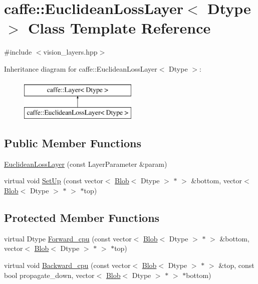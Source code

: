 \hypertarget{classcaffe_1_1_euclidean_loss_layer}{\section{caffe\+:\+:Euclidean\+Loss\+Layer$<$ Dtype $>$ Class Template Reference}
\label{classcaffe_1_1_euclidean_loss_layer}
}


{\ttfamily \#include $<$vision\+\_\+layers.\+hpp$>$}

Inheritance diagram for caffe\+:\+:Euclidean\+Loss\+Layer$<$ Dtype $>$\+:\begin{figure}[H]
\begin{center}
\leavevmode
\includegraphics[height=2.000000cm]{classcaffe_1_1_euclidean_loss_layer}
\end{center}
\end{figure}
\subsection*{Public Member Functions}
\begin{DoxyCompactItemize}
\item 
\hyperlink{classcaffe_1_1_euclidean_loss_layer_aea3a6d5454ee1a0db7cdb6c59bcfc5c8}{Euclidean\+Loss\+Layer} (const Layer\+Parameter \&param)
\item 
virtual void \hyperlink{classcaffe_1_1_euclidean_loss_layer_a636a0ded0ca547c4af9b150953bce124}{Set\+Up} (const vector$<$ \hyperlink{classcaffe_1_1_blob}{Blob}$<$ Dtype $>$ $\ast$ $>$ \&bottom, vector$<$ \hyperlink{classcaffe_1_1_blob}{Blob}$<$ Dtype $>$ $\ast$ $>$ $\ast$top)
\end{DoxyCompactItemize}
\subsection*{Protected Member Functions}
\begin{DoxyCompactItemize}
\item 
virtual Dtype \hyperlink{classcaffe_1_1_euclidean_loss_layer_ab3b17e7f7064f68b253df8d463f44dfc}{Forward\+\_\+cpu} (const vector$<$ \hyperlink{classcaffe_1_1_blob}{Blob}$<$ Dtype $>$ $\ast$ $>$ \&bottom, vector$<$ \hyperlink{classcaffe_1_1_blob}{Blob}$<$ Dtype $>$ $\ast$ $>$ $\ast$top)
\item 
virtual void \hyperlink{classcaffe_1_1_euclidean_loss_layer_aeca6594a25c462a4764f6c2e07224b2d}{Backward\+\_\+cpu} (const vector$<$ \hyperlink{classcaffe_1_1_blob}{Blob}$<$ Dtype $>$ $\ast$ $>$ \&top, const bool propagate\+\_\+down, vector$<$ \hyperlink{classcaffe_1_1_blob}{Blob}$<$ Dtype $>$ $\ast$ $>$ $\ast$bottom)
\end{DoxyCompactItemize}
